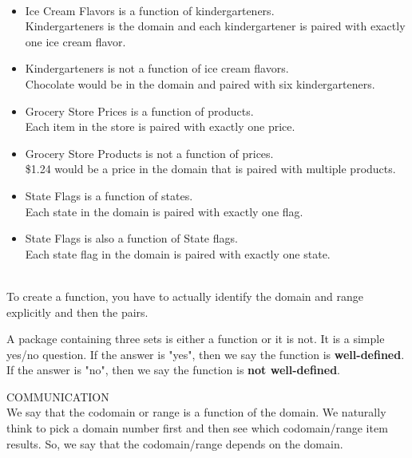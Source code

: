 \documentclass{ximera}
\begin{document}
\begin{example}
\quad \\
\begin{itemize}
\item Ice Cream Flavors is a function of kindergarteners. \\
Kindergarteners is the domain and each kindergartener is paired with exactly one ice cream flavor. 

\item Kindergarteners is not a function of ice cream flavors. \\
Chocolate would be in the domain and paired with six kindergarteners.

\item Grocery Store Prices is a function of products.\\
Each item in the store is paired with exactly one price. 

\item Grocery Store Products is not a function of prices.\\
\$1.24 would be a price in the domain that is paired with multiple products.

\item State Flags is a function of states.\\
Each state in the domain is paired with exactly one flag.

\item State Flags is also a function of State flags.\\
Each state flag in the domain is paired with exactly one state.
\end{itemize}

\end{example}
\quad \\



To create a function, you have to actually identify the domain and range explicitly and then the pairs.


\begin{definition}
A package containing three sets is either a function or it is not.  It is a simple yes/no question.  If the answer is "yes", then we say the function is \textbf{well-defined}.  If the answer is "no", then we say the function is \textbf{ not well-defined}.
\end{definition}


\begin{remark} COMMUNICATION \\
We say that the codomain or range is a function of the domain.
We naturally think to pick a domain number first and then see which codomain/range item results.  So, we say that the codomain/range depends on the domain.
\end{remark}
\end{document}
